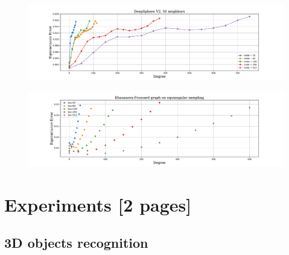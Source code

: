 \documentclass{article} %
\newcommand{\todo}[1]{{\color[rgb]{.6,.1,.6}{#1}}}
\begin{document}
\begin{figure}
	\centering
	\includegraphics[width=0.9\linewidth]{DeepSphereV2_50neighbors.pdf}
	\caption{}
	\label{fig:deepsphereV2}
\end{figure}
\begin{figure}
	\centering
	\includegraphics[width=0.9\linewidth]{khasanova_frossard.pdf}
	\caption{}
	\label{fig:khasanova_frossard}
\end{figure}


\section{Experiments [2 pages]}

\todo{
Show: \\
* meet the desiderata \\
* DeepSphere V1 and V2 are equivalent in practice, wait on SHREC and cosmo exp \\
* anisotropy doesn't help \\
}

\subsection{3D objects recognition} \label{sec:exp:objects}
\end{document}
